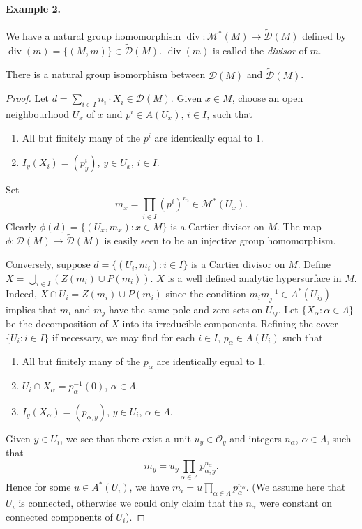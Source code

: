 \paragraph*{Example 2.} We have a natural group homomorphism $\operatorname{div}:\mathcal M^*(M)\longrightarrow\widetilde{\mathcal D}(M)$ defined by $\operatorname{div}(m)=\{(M,m)\}\in\widetilde{\mathcal D}(M)$. $\operatorname{div}(m)$ is called the \emph{divisor} of $m$.

 There is a natural group isomorphism between $\mathcal D(M)$ and $\widetilde{\mathcal D}(M)$.
\begin{proof}
Let $d=\sum_{i\in I}n_i\cdot X_i\in\mathcal D(M)$. Given $x\in M$, choose an open neighbourhood $U_x$ of $x$ and $p^i\in A(U_x)$, $i\in I$, such that
\begin{enumerate}
\item[a)] All but finitely many of the $p^i$ are identically equal to 1.
\item[b)] $I_y(X_i)=(p_y^i)$, $y\in U_x$, $i\in I$.
\end{enumerate}
Set
\[
m_x=\prod_{i\in I}(p^i)^{n_i}\in\mathcal M^*(U_x).
\]
Clearly $\phi(d)=\{(U_x,m_x):x\in M\}$ is a Cartier divisor on $M$. The map $\phi:\mathcal D(M)\longrightarrow\widetilde{\mathcal D}(M)$ is easily seen to be an injective group homomorphism.

Conversely, suppose $d=\{(U_i,m_i):i\in I\}$ is a Cartier divisor on $M$. Define $X=\bigcup_{i\in I}(Z(m_i)\cup P(m_i))$. $X$ is a well defined analytic hypersurface in $M$. Indeed, $X\cap U_i=Z(m_i)\cup P(m_i)$ since the condition $m_im_j^{-1}\in A^*(U_{ij})$ implies that $m_i$ and $m_j$ have the same pole and zero sets on $U_{ij}$. Let $\{X_\alpha:\alpha\in\Lambda\}$ be the decomposition of $X$ into its irreducible components. Refining the cover $\{U_i:i\in I\}$ if necessary, we may find for each $i\in I$, $p_\alpha\in A(U_i)$ such that
\begin{enumerate}
\item[a)] All but finitely many of the $p_\alpha$ are identically equal to 1.
\item[b)] $U_i\cap X_\alpha=p_\alpha^{-1}(0)$, $\alpha\in\Lambda$.
\item[c)] $I_y(X_\alpha)=(p_{\alpha,y})$, $y\in U_i$, $\alpha\in\Lambda$.
\end{enumerate}
Given $y\in U_i$, we see that there exist a unit $u_y\in\mathcal O_y$ and integers $n_\alpha$, $\alpha\in\Lambda$, such that
\[
m_y=u_y\prod_{\alpha\in\Lambda}p_{\alpha,y}^{n_\alpha}.
\]
Hence for some $u\in A^*(U_i)$, we have $m_i=u\prod_{\alpha\in\Lambda}p_\alpha^{n_\alpha}$. (We assume here that $U_i$ is connected, otherwise we could only claim that the $n_\alpha$ were constant on connected components of $U_i$).


\end{proof}
